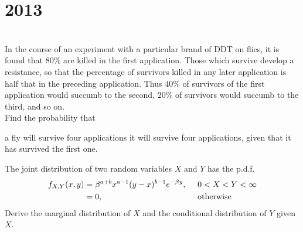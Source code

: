\section*{2013}
\vspace{-.5cm}
\hrulefill \smallskip\\
 In the course of an experiment with a particular brand of DDT on flies, it is found that 80\% are killed in the first application. Those which survive develop a resistance, so that the percentage of survivors killed in any later application is half that in the preceding application. Thus 40\% of survivors of the first application would succumb to the second, 20\% of survivors would succumb to the third, and so on. \smallskip \\
Find the probability that \begin{tasks}
\task a fly will survive four applications
\task it will survive four applications, given that it has survived the first one.\end{tasks}
 The joint distribution of two random variables $X$ and $Y$ has the p.d.f. \[ \begin{aligned} f_{X,Y}(x,y) &= \beta^{a+b}x^{a-1}(y-x)^{b-1}e^{-\beta y}, \enskip&&0<X<Y<\infty \\
& = 0, && \text{otherwise}
\end{aligned}\] Derive the marginal distribution of $X$ and the conditional distribution of $Y$ given $X$.
